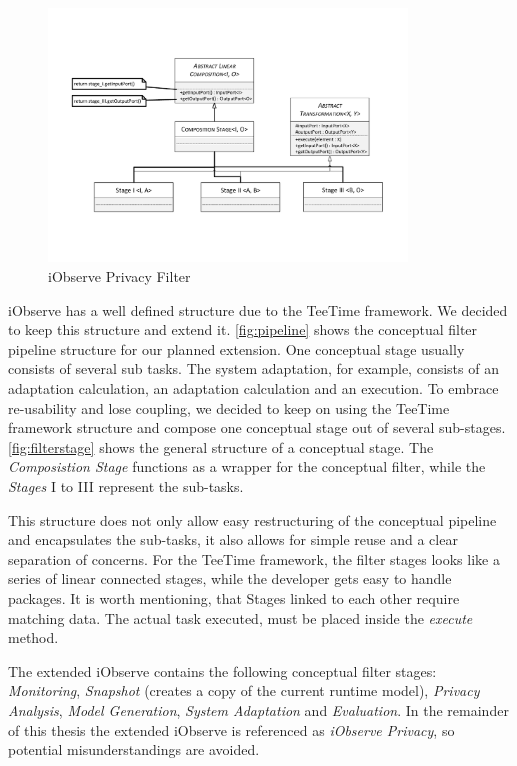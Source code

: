 \begin{figure}[h]
	\centering
	\includegraphics[trim = 20mm 40mm 20mm 35mm, clip, width=0.85\textwidth]{graphs/StageComposition}
	\caption{iObserve Privacy Filter}
	\label{fig:filterstage}
\end{figure}

iObserve has a well defined structure due to the TeeTime framework. We decided to keep this structure and extend it. \autoref{fig:pipeline} shows the conceptual filter pipeline structure for our planned extension. One conceptual stage usually consists of several sub tasks. The system adaptation, for example, consists of an adaptation calculation, an adaptation calculation and an execution. To embrace re-usability and lose coupling, we decided to keep on using the TeeTime framework structure and compose one conceptual stage out of several sub-stages. \autoref{fig:filterstage} shows the general structure of a conceptual stage. The \textit{Composistion Stage} functions as a wrapper for the conceptual filter, while the \textit{Stages} I to III represent the sub-tasks.

This structure does not only allow easy restructuring of the conceptual pipeline and encapsulates the sub-tasks, it also allows for simple reuse and a clear separation of concerns. 
For the TeeTime framework, the filter stages looks like a series of linear connected stages, while the developer gets easy to handle packages. It is worth mentioning, that Stages linked to each other require matching data. The actual task executed, must be placed inside the \textit{execute} method.

The extended iObserve contains the following conceptual filter stages: \textit{Monitoring}, \textit{Snapshot} (creates a copy of the current runtime model), \textit{Privacy Analysis}, \textit{Model Generation}, \textit{System Adaptation} and \textit{Evaluation}. In the remainder of this thesis the extended iObserve is referenced as \textit{iObserve Privacy}, so potential misunderstandings are avoided.



